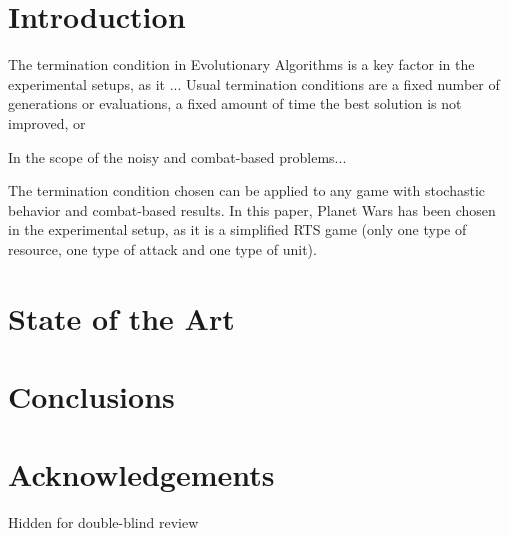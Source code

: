 \documentclass[runningheads,a4paper]{llncs}
\begin{document}
\section{Introduction}

The termination condition in Evolutionary Algorithms is a key factor in the experimental setups, as it ... Usual termination conditions are a fixed number of generations or evaluations, a fixed amount of time the best solution is not improved, or 

In the scope of the noisy and combat-based problems...

The termination condition chosen can be applied to any game with stochastic behavior and combat-based results. In this paper, Planet Wars has been chosen in the experimental setup, as it is a simplified RTS game (only one type of resource, one type of attack and one type of unit).

\section{State of the Art}

\section{Conclusions}

\section*{Acknowledgements}

Hidden for double-blind review



\end{document}
